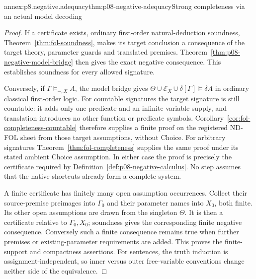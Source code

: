\begin{annexitem}{annex:p8.negative.adequacy}{thm:p08-negative-adequacy}{Strong completeness via an actual model decoding}
\begin{proof}
If a certificate exists, ordinary first-order natural-deduction soundness,
Theorem~\ref{thm:fol-soundness}, makes its target conclusion a
consequence of the target theory, parameter guards and translated premises.
Theorem~\ref{thm:p08-negative-model-bridge} then gives the exact negative
consequence.  This establishes soundness for every allowed signature.

Conversely, if \(\Gamma\models_{-,X}A\), the model bridge gives
\(\Theta\cup\mathcal E_X\cup\delta[\Gamma]\models\delta A\)
in ordinary classical first-order logic.  For countable signatures the
target signature is still countable: it adds only one predicate and an
infinite variable supply, and translation introduces no other function
or predicate symbols.  Corollary~\ref{cor:fol-completeness-countable}
therefore supplies a finite proof on the registered ND-FOL sheet from
those target assumptions, without Choice.  For arbitrary signatures
Theorem~\ref{thm:fol-completeness} supplies the same proof under its
stated ambient Choice assumption.  In either case the proof is precisely
the certificate required by Definition~\ref{def:p08-negative-calculus}.
No step assumes that the native shortcuts already form a complete system.

A finite certificate has finitely many open assumption occurrences.
Collect their source-premise preimages into \(\Gamma_0\) and their
parameter names into \(X_0\), both finite.  Its other open assumptions
are drawn from the singleton \(\Theta\).  It is then a certificate
relative to \(\Gamma_0,X_0\); soundness gives the corresponding finite
negative consequence.  Conversely such a finite consequence remains
true when further premises or existing-parameter requirements are added.
This proves the finite-support and compactness assertions.  For sentences,
the truth induction is assignment-independent, so inner versus outer
free-variable conventions change neither side of the equivalence.
\end{proof}
\end{annexitem}

